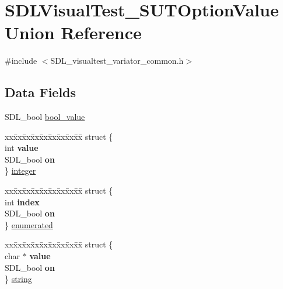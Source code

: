 \hypertarget{union_s_d_l_visual_test___s_u_t_option_value}{\section{S\-D\-L\-Visual\-Test\-\_\-\-S\-U\-T\-Option\-Value Union Reference}
\label{union_s_d_l_visual_test___s_u_t_option_value}
}


{\ttfamily \#include $<$S\-D\-L\-\_\-visualtest\-\_\-variator\-\_\-common.\-h$>$}

\subsection*{Data Fields}
\begin{DoxyCompactItemize}
\item 
S\-D\-L\-\_\-bool \hyperlink{union_s_d_l_visual_test___s_u_t_option_value_ace8ec6519c056e35443a6c401f3d0941}{bool\-\_\-value}
\item 
\begin{tabbing}
xx\=xx\=xx\=xx\=xx\=xx\=xx\=xx\=xx\=\kill
struct \{\\
\>int {\bfseries value}\\
\>SDL\_bool {\bfseries on}\\
\} \hyperlink{union_s_d_l_visual_test___s_u_t_option_value_a4291d9ad3cfb3fe1645ea2732e11d68a}{integer}\\

\end{tabbing}\item 
\begin{tabbing}
xx\=xx\=xx\=xx\=xx\=xx\=xx\=xx\=xx\=\kill
struct \{\\
\>int {\bfseries index}\\
\>SDL\_bool {\bfseries on}\\
\} \hyperlink{union_s_d_l_visual_test___s_u_t_option_value_ad40e26afd4b8532327b61897d5b009e3}{enumerated}\\

\end{tabbing}\item 
\begin{tabbing}
xx\=xx\=xx\=xx\=xx\=xx\=xx\=xx\=xx\=\kill
struct \{\\
\>char $\ast$ {\bfseries value}\\
\>SDL\_bool {\bfseries on}\\
\} \hyperlink{union_s_d_l_visual_test___s_u_t_option_value_a2bf4b969ff9633c937e4d15118d1edc6}{string}\\

\end{tabbing}\end{DoxyCompactItemize}


